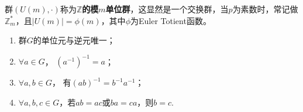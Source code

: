 \begin{note}
	群$(U(m), \cdot)$称为\textbf{$\mathbb{Z}$的模$m$单位群}，这显然是一个交换群，当$p$为素数时，常记做$\mathbb{Z}_m^*$，且$|U(m)| = \phi(m)$，其中$\phi$为Euler Totient函数。
\end{note}
\begin{theorem}
	\begin{enumerate}
		\item 群$G$的单位元与逆元唯一；
		\item $\forall a\in G$， $(a^{-1})^{-1} = a$；
		\item $\forall a, b\in G$， 有$(ab)^{-1} = b^{-1}a^{-1}$；
		\item $\forall a, b, c\in G$，若$ab = ac$或$ba=ca$，则$b=c$.
	\end{enumerate}
\end{theorem}

